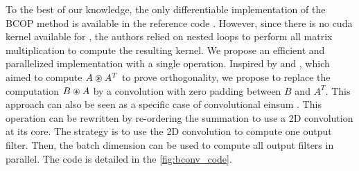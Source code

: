     To the best of our knowledge, the only differentiable implementation of the BCOP method is available in the reference code \cite{li_preventing_2019}. However, since there is no cuda kernel available for \Bconv, the authors relied on nested loops to perform all matrix multiplication to compute the resulting kernel. %
    We propose an efficient and parallelized implementation with a single operation. %
    Inspired by \cite{wang_orthogonal_2020} and \cite{delattre2023efficient}, which aimed to compute $A\circledast A^T$ to prove orthogonality, we propose to replace the computation $B\circledast A$  by a convolution with zero padding between $B$ and $A^T$. This approach can also be seen as a specific case of convolutional einsum \cite{rabbani2024conv_einsum}.
    This operation can be rewritten by re-ordering the summation to use a 2D convolution at its core. The strategy is to use the 2D convolution to compute one output filter. Then, the batch dimension can be used to compute all output filters in parallel. The code is detailed in the \cref{fig:bconv_code}.


